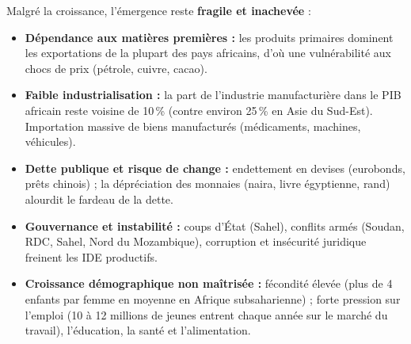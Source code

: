 \documentclass[11pt]{article}
\begin{document}
\begin{propriete}
Malgré la croissance, l'émergence reste \textbf{fragile et inachevée} :
\begin{itemize}
    \item \textbf{Dépendance aux matières premières :} les produits primaires dominent les exportations de la plupart des pays africains, d'où une vulnérabilité aux chocs de prix (pétrole, cuivre, cacao).
    \item \textbf{Faible industrialisation :} la part de l'industrie manufacturière dans le PIB africain reste voisine de 10\,\% (contre environ 25\,\% en Asie du Sud-Est). Importation massive de biens manufacturés (médicaments, machines, véhicules).
    \item \textbf{Dette publique et risque de change :} endettement en devises (eurobonds, prêts chinois) ; la dépréciation des monnaies (naira, livre égyptienne, rand) alourdit le fardeau de la dette.
    \item \textbf{Gouvernance et instabilité :} coups d'État (Sahel), conflits armés (Soudan, RDC, Sahel, Nord du Mozambique), corruption et insécurité juridique freinent les IDE productifs.
    \item \textbf{Croissance démographique non maîtrisée :} fécondité élevée (plus de 4 enfants par femme en moyenne en Afrique subsaharienne) ; forte pression sur l'emploi (10 à 12 millions de jeunes entrent chaque année sur le marché du travail), l'éducation, la santé et l'alimentation.
\end{itemize}
\end{propriete}
\end{document}
